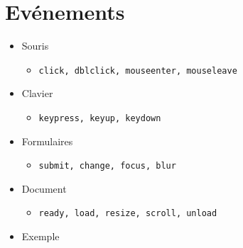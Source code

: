 \begin{english}

\begin{Shaded}
\begin{Highlighting}[]
\FunctionTok{$}\NormalTok{(}\NormalTok{)}\NormalTok{(}\NormalTok{)}\OperatorTok{;}                 
\FunctionTok{$}\NormalTok{(}\NormalTok{)}\NormalTok{(\{}\OperatorTok{:}\OperatorTok{,}\OperatorTok{:}\NormalTok{\})}\OperatorTok{;}   
\end{Highlighting}
\end{Shaded}

\end{english}

\hypertarget{evuxe9nements}{%
\section{Evénements}\label{evuxe9nements}}

\begin{itemize}
\tightlist
\item
  Souris

  \begin{itemize}
  \tightlist
  \item
    \textenglish{\texttt{click,\ dblclick,\ mouseenter,\ mouseleave}}
  \end{itemize}
\item
  Clavier

  \begin{itemize}
  \tightlist
  \item
    \textenglish{\texttt{keypress,\ keyup,\ keydown}}
  \end{itemize}
\item
  Formulaires

  \begin{itemize}
  \tightlist
  \item
    \textenglish{\texttt{submit,\ change,\ focus,\ blur}}
  \end{itemize}
\item
  Document

  \begin{itemize}
  \tightlist
  \item
    \textenglish{\texttt{ready,\ load,\ resize,\ scroll,\ unload}}
  \end{itemize}
\item
  Exemple
\end{itemize}

